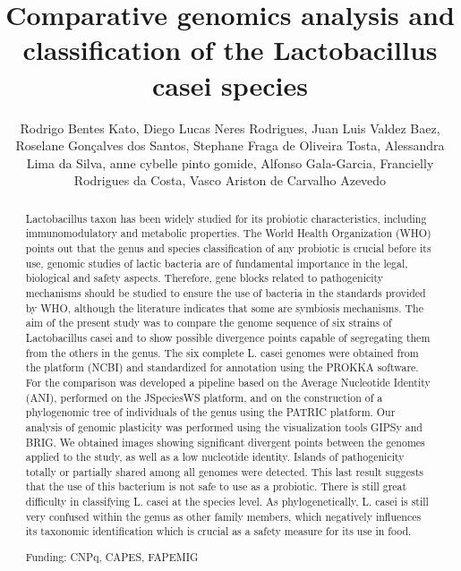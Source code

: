 \documentclass[twoside]{article}
\title{\vspace{-15mm}\fontsize{24pt}{10pt}\selectfont\textbf{ Comparative genomics analysis and classification of the Lactobacillus casei species }} %
\author{ Rodrigo Bentes Kato, Diego Lucas Neres Rodrigues, Juan Luis Valdez Baez, Roselane Gon\c{c}alves dos Santos, Stephane Fraga de Oliveira Tosta, Alessandra Lima da Silva, anne cybelle pinto gomide, Alfonso Gala-Garcia, Francielly Rodrigues da Costa, Vasco Ariston de Carvalho Azevedo }
\affil{ Universidade Federal de Minas Gerais }
\date{}
\begin{document}
  
  
  \maketitle %
  
  
  \thispagestyle{fancy} %
  
  
  \begin{abstract}
  Lactobacillus taxon has been widely studied for its probiotic characteristics,  including immunomodulatory and metabolic properties. The World Health Organization (WHO) points out that the genus and species classification of any probiotic is crucial before its use,  genomic studies of lactic bacteria are of fundamental importance in the legal,  biological and safety aspects. Therefore,  gene blocks related to pathogenicity mechanisms should be studied to ensure the use of bacteria in the standards provided by WHO,  although the literature indicates that some are symbiosis mechanisms. The aim of the present study was to compare the genome sequence of six strains of Lactobacillus casei and to show possible divergence points capable of segregating them from the others in the genus. The six complete L. casei genomes were obtained from the platform (NCBI) and standardized for annotation using the PROKKA software. For the comparison was developed a pipeline based on the Average Nucleotide Identity (ANI),  performed on the JSpeciesWS platform,  and on the construction of a phylogenomic tree of individuals of the genus using the PATRIC platform. Our analysis of genomic plasticity was performed using the visualization tools GIPSy and BRIG. We obtained images showing significant divergent points between the genomes applied to the study,  as well as a low nucleotide identity. Islands of pathogenicity totally or partially shared among all genomes were detected. This last result suggests that the use of this bacterium is not safe to use as a probiotic. There is still great difficulty in classifying L. casei at the species level. As phylogenetically,  L. casei is still very confused within the genus as other family members,  which negatively influences its taxonomic identification which is crucial as a safety measure for its use in food.
  
  Funding: CNPq,  CAPES,  FAPEMIG \\ 
  \end{abstract}
  
\end{document}
